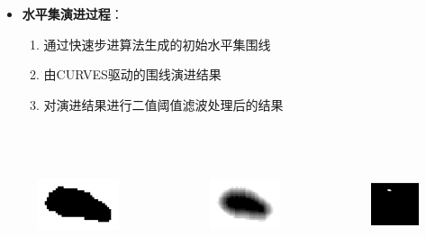 \begin{frame}
\begin{itemize}
  \item \textbf{水平集演进过程}：
  \begin{enumerate}
    \item 通过快速步进算法生成的初始水平集围线
    \item 由CURVES驱动的围线演进结果
    \item 对演进结果进行二值阈值滤波处理后的结果
  \end{enumerate}
\end{itemize}
\begin{columns}[b,onlytextwidth]
\begin{column}{.3\textwidth}
\begin{figure}[t]
\centering
\includegraphics[height=1.5in]{../../Figures/coronary/fastmarching.eps}
\end{figure}
\end{column}
\begin{column}{.3\textwidth}
\begin{figure}[t]
\centering
\includegraphics[height=1.5in]{../../Figures/coronary/curves.eps}
\end{figure}
\end{column}
\begin{column}{.3\textwidth}
\begin{figure}[t]
\centering
\includegraphics[height=1.5in]{../../Figures/coronary/final.eps}
\end{figure}
\end{column}
\end{columns}
\end{frame} 

